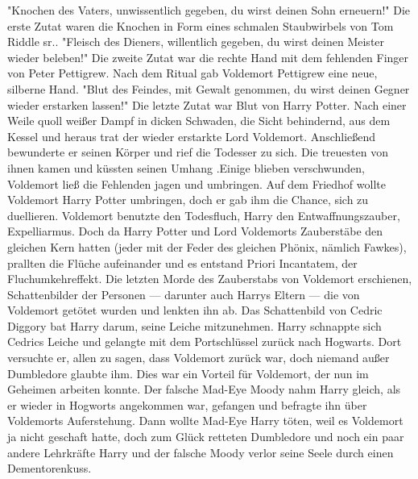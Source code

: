 \documentclass[a4paper, 10pt]{article}
\begin{document}
\vspace{10pt}
\newline
"Knochen des Vaters, unwissentlich gegeben, du wirst deinen Sohn erneuern!"
Die erste Zutat waren die Knochen in Form eines schmalen Staubwirbels von Tom Riddle sr..
\vspace{10pt}
\newline
"Fleisch des Dieners, willentlich gegeben, du wirst deinen Meister wieder beleben!"
Die zweite Zutat war die rechte Hand mit dem fehlenden Finger von Peter Pettigrew. Nach dem Ritual gab Voldemort Pettigrew eine neue, silberne Hand.
\vspace{10pt}
\newline
"Blut des Feindes, mit Gewalt genommen, du wirst deinen Gegner wieder erstarken lassen!"
Die letzte Zutat war Blut von Harry Potter.
\vspace{10pt}
\newline
Nach einer Weile quoll weißer Dampf in dicken Schwaden, die Sicht behindernd, aus dem Kessel und heraus trat der wieder erstarkte Lord Voldemort.
\vspace{10pt}
\newline
Anschließend bewunderte er seinen Körper und rief die Todesser zu sich. Die treuesten von ihnen kamen und küssten seinen Umhang .Einige blieben verschwunden, Voldemort ließ die Fehlenden jagen und umbringen.
\vspace{10pt}
\newline
Auf dem Friedhof wollte Voldemort Harry Potter umbringen, doch er gab ihm die Chance, sich zu duellieren. Voldemort benutzte den Todesfluch, Harry den Entwaffnungszauber, Expelliarmus. Doch da Harry Potter und Lord Voldemorts Zauberstäbe den gleichen Kern hatten (jeder mit der Feder des gleichen Phönix, nämlich Fawkes), prallten die Flüche aufeinander und es entstand Priori Incantatem, der Fluchumkehreffekt. Die letzten Morde des Zauberstabs von Voldemort erschienen, Schattenbilder der Personen — darunter auch Harrys Eltern — die von Voldemort getötet wurden und lenkten ihn ab. Das Schattenbild von Cedric Diggory bat Harry darum, seine Leiche mitzunehmen. Harry schnappte sich Cedrics Leiche und gelangte mit dem Portschlüssel zurück nach Hogwarts. Dort versuchte er, allen zu sagen, dass Voldemort zurück war, doch niemand außer Dumbledore glaubte ihm. Dies war ein Vorteil für Voldemort, der nun im Geheimen arbeiten konnte. Der falsche Mad-Eye Moody nahm Harry gleich, als er wieder in Hogworts angekommen war, gefangen und befragte ihn über Voldemorts Auferstehung. Dann wollte Mad-Eye Harry töten, weil es Voldemort ja nicht geschaft hatte, doch zum Glück retteten Dumbledore und noch ein paar andere Lehrkräfte Harry und der falsche Moody verlor seine Seele durch einen Dementorenkuss.
\end{document}
